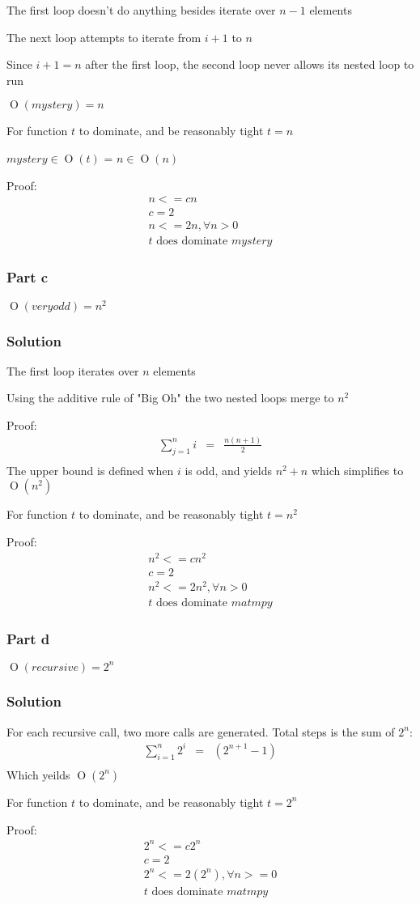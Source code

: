\documentclass[10pt,letterpaper,oneside]{article}
\newcommand{\Part}[1]{\subsubsection*{Part #1}}
\newcommand{\Solution}{\subsubsection*{Solution}}
\DeclareMathOperator{\Omicron}{O}
\newcommand{\BigOh}[1]{\Omicron(#1)}
\begin{document}
			The first loop doesn't do anything besides iterate over $n-1$ elements

			The next loop attempts to iterate from $i+1$ to $n$

			Since $i+1 = n$ after the first loop, the second loop never allows its nested loop to run
		
			$\BigOh{mystery} = n$

			For function $t$ to dominate, and be reasonably tight $t=n$
			
			$mystery \in \BigOh{t}$ = $n \in \BigOh{n}$

			Proof:
				\begin{eqnarray*}
					\text{$n <= cn$}\\
					\text{$c=2$}\\
					\text{$n<= 2n$}, \forall n>0\\
					\text{$t$ does dominate $mystery$}
				\end{eqnarray*}
	\Part{c}
		$\BigOh{veryodd} = n^2$	
		\Solution
			The first loop iterates over $n$ elements

			Using the additive rule of "Big Oh" the two nested loops merge to $n^2$

			Proof:
				\begin{eqnarray}
					\sum_{j=1}^n i  & = & \frac{n(n+1)}{2}  \\\
				\end{eqnarray} 
			The upper bound is defined when $i$ is odd, and yields $n^2 + n$ which simplifies to $\BigOh{n^2}$
			
			For function $t$ to dominate, and be reasonably tight $t=n^2$

			Proof:
				\begin{eqnarray*}
					\text{$n^2 <= cn^2$}\\
					\text{$c=2$}\\
					\text{$n^2 <= 2n^2$}, \forall n>0\\
					\text{$t$ does dominate $matmpy$}
				\end{eqnarray*}
	\Part{d}
	$\BigOh{recursive} = 2^n$
	\Solution
	For each recursive call, two more calls are generated. Total steps is the sum of $2^n$:
			\begin{eqnarray}
				\sum_{i=1}^n 2^i  & = & (2^{n+1}-1) \\
			\end{eqnarray} 
	Which yeilds $\BigOh{2^n}$

	For function $t$ to dominate, and be reasonably tight $t=2^n$

			Proof:
				\begin{eqnarray*}
					\text{$2^n <= c2^n$}\\
					\text{$c=2$}\\
					\text{$2^n <= 2(2^n)$}, \forall n>=0\\
					\text{$t$ does dominate $matmpy$}
				\end{eqnarray*}
	
\end{document}
